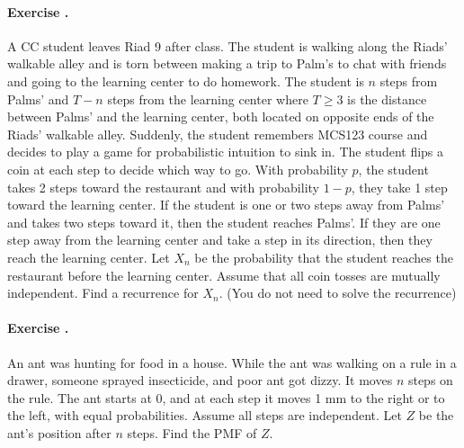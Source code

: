 \documentclass[twocolumn,12pt,a4paper]{article}
\newcounter{num}  %
\begin{document}
\paragraph{Exercise \thenum.}

A CC student leaves Riad 9 after class.
The student is walking along the Riads' walkable alley and is torn between making a trip to Palm's to chat with friends and going to the learning center to do homework. 
The student is $n$ steps from Palms' and $T-n$ steps from the learning center where $T \geq 3$ is the distance between Palms' and the
learning center, both located on opposite ends of the Riads' walkable alley.
Suddenly, the student remembers MCS123 course and decides to play a game for probabilistic intuition to sink in.
The student flips a coin at each step to decide which way to go. 
With probability $p$, the student takes 2 steps toward the restaurant and with probability $1-p$, they take 1 step toward the learning center. 
If the student is one or two steps away from Palms' and takes two steps toward it, then the student reaches Palms'. 
If they are one step away from the learning center and take a step in its direction, then they reach the learning center. 
Let $X_n$ be the probability that the student reaches the
restaurant before the learning center. 
Assume that all coin tosses are mutually independent.
Find a recurrence for $X_n$. (You do not need to solve the recurrence)


\iffalse
\stepcounter{num} 
\paragraph{Exercise \thenum.}
For two positive integers \( A \) and \( B \), what is the probability that a symmetric 1D random walk reaches \( A \) before it reaches \( -B \)? Let \( \tau \) be the first time at which the random walk reaches either \( A \) or \( -B \). Then \( X_\tau = A \) or \( -B \).
\fi


\paragraph{Exercise \thenum.}
An ant was hunting for food in a house.
While the ant was walking on a rule in a drawer, someone sprayed insecticide, and poor ant got dizzy. 
It moves $n$ steps on the rule. 
The ant starts at 0, and at each step it moves 1 mm to the right or to the left, with equal probabilities. 
Assume all steps are independent. 
Let $Z$ be the ant's position after $n$ steps. 
Find the PMF of $Z$. 
\end{document}

